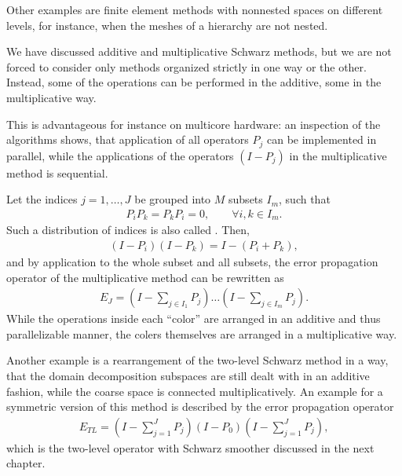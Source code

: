 \begin{example}
  Other examples are finite element methods with nonnested spaces on
  different levels, for instance, when the meshes of a hierarchy are
  not nested.
\end{example}

\begin{remark}
  We have discussed additive and multiplicative Schwarz methods, but
  we are not forced to consider only methods organized strictly in one
  way or the other. Instead, some of the operations can be performed
  in the additive, some in the multiplicative way.
  
  This is advantageous for instance on multicore hardware: an
  inspection of the algorithms shows, that application of all
  operators $P_j$ can be implemented in parallel, while the
  applications of the operators $(I-P_j)$ in the multiplicative method
  is sequential.
\end{remark}

\begin{example}
  Let the indices $j=1,\dots,J$ be grouped into $M$ subsets $I_m$,
  such that
  \begin{gather*}
    P_iP_k = P_k P_i = 0,\qquad \forall i,k\in I_m.
  \end{gather*}
  Such a distribution of indices is also called
  . Then,
  \begin{gather*}
    (I-P_i)(I-P_k) = I- (P_i+P_k),
  \end{gather*}
  and by application to the whole subset and all subsets, the error
  propagation operator of the multiplicative method can be rewritten
  as
  \begin{gather*}
    E_J = \left(I-\sum_{j\in I_1} P_j \right)
    \dots
    \left(I-\sum_{j\in I_m} P_j \right).
  \end{gather*}
  While the operations inside each ``color'' are arranged in an
  additive and thus parallelizable manner, the colers themselves are
  arranged in a multiplicative way.
\end{example}

\begin{example}
  Another example is a rearrangement of the two-level Schwarz method
  in a way, that the domain decomposition subspaces are still dealt
  with in an additive fashion, while the coarse space is connected
  multiplicatively. An example for a symmetric version of this method
  is described by the error propagation operator
  \begin{gather}
    \label{eq:schwarz:51}
    E_{TL} = \left(I-\sum_{j=1}^J P_j \right) (I-P_0)
    \left(I-\sum_{j=1}^J P_j \right),
  \end{gather}
  which is the two-level operator with Schwarz smoother discussed in
  the next chapter.
\end{example}


